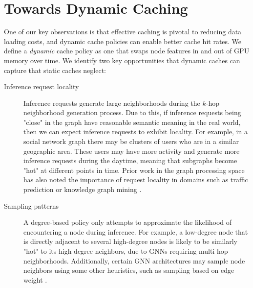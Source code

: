 

\section{Towards Dynamic Caching} \label{Design: Towards Dynamic Caching}
One of our key observations is that effective caching is pivotal to reducing data loading costs, and dynamic cache policies can enable better cache hit rates.
We define a \textit{dynamic} cache policy as one that swaps node features in and out of GPU memory over time. We identify two key opportunities  that dynamic caches can capture that static caches neglect:
\begin{description}
    \item[Inference request locality] Inference requests generate large neighborhoods during the $k$-hop neighborhood generation process. Due to this, if inference requests being "close" in the graph have reasonable semantic meaning in the real world, then we can expect inference requests to exhibit locality. For example, in a social network graph there may be clusters of users who are in a similar geographic area. These users may have more activity and generate more inference requests during the daytime, meaning that subgraphs become "hot" at different points in time. Prior work in the graph processing space has also noted the importance of request locality in domains such as traffic prediction or knowledge graph mining \cite{QGraph_2018}.
    \item[Sampling patterns] A degree-based policy only attempts to approximate the likelihood of encountering a node during inference. For example, a low-degree node that is directly adjacent to several high-degree nodes is likely to be similarly "hot" to its high-degree neighbors, due to GNNs requiring multi-hop neighborhoods. Additionally, certain GNN architectures may sample node neighbors using some other heuristics, such as sampling based on edge weight \cite{GAT_2018}.
\end{description}

